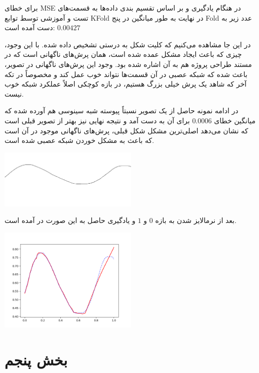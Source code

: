 \documentclass[12pt,titlepage,a4page , tikz , multi,table , svgnames,xcdraw]{article}
\begin{document}
برای خطای MSE در هنگام یادگیری و بر اساس تقسیم بندی داده‌ها به قسمت‌های تست و آموزشی توسط توابع KFold در نهایت به طور میانگین در پنج Fold عدد زیر به دست آمده است:
$ 0.00427$




\hrulefill


در این جا مشاهده می‌کنیم که کلیت شکل به درستی تشخیص داده شده. با این وجود، چیزی که باعث ایجاد مشکل عمده شده است، همان پرش‌های ناگهانی است که در مستند طراحی پروژه هم به آن اشاره شده بود. وجود این پرش‌های ناگهانی در تصویر، باعث شده که شبکه عصبی در آن قسمت‌ها نتواند خوب عمل کند و مخصوصاً در تکه آخر که شاهد یک پرش خیلی بزرگ هستیم، در بازه کوچکی اصلاً عملکرد شبکه خوب نیست.

در ادامه نمونه حاصل از یک تصویر نسبتاً پیوسته شبه سینوسی هم آورده شده که میانگین خطای 
 $0.0006$
 برای آن به دست آمد و نتیجه نهایی نیز بهتر از تصویر قبلی است که نشان می‌دهد اصلی‌ترین مشکل شکل قبلی، پرش‌های ناگهانی موجود در آن است که باعث به مشکل خوردن شبکه عصبی شده است.
 
 
 \begin{center}

 \includegraphics[width=0.5\textwidth]{pictures/17.png}

\end{center}

بعد از نرمالایز شدن به بازه $0$ و $1$ و یادگیری حاصل به این صورت در آمده است. 


\begin{center}

 \includegraphics[width=0.5\textwidth]{pictures/18.png}

\end{center}
\newpage


\section{بخش پنجم}
\end{document}
